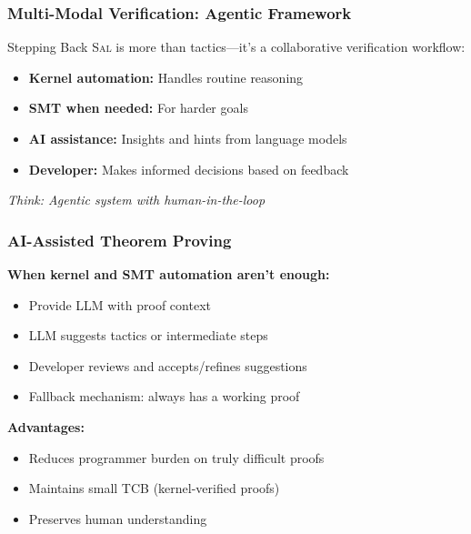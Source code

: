\documentclass[usepdftitle=false]{beamer}
\newcommand{\sal}{\textsc{Sal}\xspace}
\begin{document}
\begin{frame}
  \frametitle{Multi-Modal Verification: Agentic Framework}
  
  \begin{block}{Stepping Back}
    \sal is more than tactics—it's a collaborative verification workflow:
  \end{block}
  
  \vspace{0.3cm}
  \begin{itemize}
    \item \textbf{Kernel automation:} Handles routine reasoning
    \item \textbf{SMT when needed:} For harder goals
    \item \textbf{AI assistance:} Insights and hints from language models
    \item \textbf{Developer:} Makes informed decisions based on feedback
  \end{itemize}
  
  \vspace{0.3cm}
  \textit{Think: Agentic system with human-in-the-loop}
\end{frame}

\begin{frame}
  \frametitle{AI-Assisted Theorem Proving}
  
  \textbf{When kernel and SMT automation aren't enough:}
  
  \begin{itemize}
    \item Provide LLM with proof context
    \item LLM suggests tactics or intermediate steps
    \item Developer reviews and accepts/refines suggestions
    \item Fallback mechanism: always has a working proof
  \end{itemize}
  
  \vspace{0.3cm}
  \textbf{Advantages:}
  \begin{itemize}
    \item Reduces programmer burden on truly difficult proofs
    \item Maintains small TCB (kernel-verified proofs)
    \item Preserves human understanding
  \end{itemize}
\end{frame}

\end{document}
